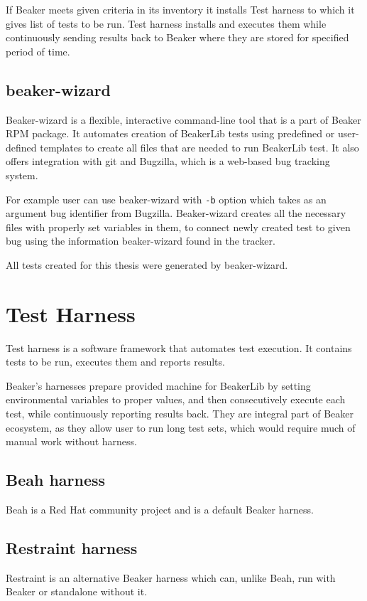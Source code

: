 If Beaker meets given criteria in its inventory it installs Test harness to which it gives list of tests to be run.  Test harness installs and executes them while continuously sending results back to Beaker where they are stored for specified period of time. 

\subsection{beaker-wizard}
Beaker-wizard is a flexible, interactive command-line tool that is a part of Beaker RPM package. It automates creation of BeakerLib tests using predefined or user-defined templates to create all files that are needed to run BeakerLib test.  It also offers integration with git and Bugzilla, which is a web-based bug tracking system.

For example user can use beaker-wizard with \texttt{-b} option which takes as an argument bug identifier from Bugzilla. Beaker-wizard creates all the necessary files with properly set variables in them, to connect newly created test to given bug using the information beaker-wizard found in the tracker.

All tests created for this thesis were generated by beaker-wizard.

\section{Test Harness}
Test harness is a software framework that automates test execution. It contains tests to be run, executes them and reports results.

Beaker’s harnesses prepare provided machine for BeakerLib by setting environmental variables to proper values, and then consecutively execute each test, while continuously reporting results back. They are integral part of Beaker ecosystem, as they allow user to run long test sets, which would  require much of manual work without harness.

\subsection{Beah harness}
Beah is a Red Hat community project and  is a default Beaker harness\cite{beah_doc}.

\subsection{Restraint harness}
Restraint is an alternative Beaker harness which can, unlike Beah, run with Beaker or standalone without it\cite{restraint_doc}.

